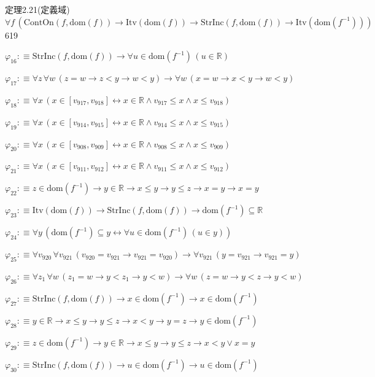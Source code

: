 \begin{fullproof}{定理2.21(定義域)}{$\forall f\,(\mathrm{ContOn}(f,\mathrm{dom}(f)) \to \mathrm{Itv}(\mathrm{dom}(f)) \to \mathrm{StrInc}(f,\mathrm{dom}(f)) \to \mathrm{Itv}(\mathrm{dom}(f^{-1})))$}{619}
\begin{abbrevlist}
\item $\varphi_{16} :\equiv \mathrm{StrInc}(f,\mathrm{dom}(f)) \to \forall u \in \mathrm{dom}(f^{-1})\,(u \in \mathbb{R})$
\item $\varphi_{17} :\equiv \forall z\,\forall w\,(z = w \to z < y \to w < y) \to \forall w\,(x = w \to x < y \to w < y)$
\item $\varphi_{18} :\equiv \forall x\,(x \in [v_{917},v_{918}] \leftrightarrow x \in \mathbb{R} \land v_{917} \leq x \land x \leq v_{918})$
\item $\varphi_{19} :\equiv \forall x\,(x \in [v_{914},v_{915}] \leftrightarrow x \in \mathbb{R} \land v_{914} \leq x \land x \leq v_{915})$
\item $\varphi_{20} :\equiv \forall x\,(x \in [v_{908},v_{909}] \leftrightarrow x \in \mathbb{R} \land v_{908} \leq x \land x \leq v_{909})$
\item $\varphi_{21} :\equiv \forall x\,(x \in [v_{911},v_{912}] \leftrightarrow x \in \mathbb{R} \land v_{911} \leq x \land x \leq v_{912})$
\item $\varphi_{22} :\equiv z \in \mathrm{dom}(f^{-1}) \to y \in \mathbb{R} \to x \leq y \to y \leq z \to x = y \to x = y$
\item $\varphi_{23} :\equiv \mathrm{Itv}(\mathrm{dom}(f)) \to \mathrm{StrInc}(f,\mathrm{dom}(f)) \to \mathrm{dom}(f^{-1}) \subseteq \mathbb{R}$
\item $\varphi_{24} :\equiv \forall y\,(\mathrm{dom}(f^{-1}) \subseteq y \leftrightarrow \forall u \in \mathrm{dom}(f^{-1})\,(u \in y))$
\item $\varphi_{25} :\equiv \forall v_{920}\,\forall v_{921}\,(v_{920} = v_{921} \to v_{921} = v_{920}) \to \forall v_{921}\,(y = v_{921} \to v_{921} = y)$
\item $\varphi_{26} :\equiv \forall z_{1}\,\forall w\,(z_{1} = w \to y < z_{1} \to y < w) \to \forall w\,(z = w \to y < z \to y < w)$
\item $\varphi_{27} :\equiv \mathrm{StrInc}(f,\mathrm{dom}(f)) \to x \in \mathrm{dom}(f^{-1}) \to x \in \mathrm{dom}(f^{-1})$
\item $\varphi_{28} :\equiv y \in \mathbb{R} \to x \leq y \to y \leq z \to x < y \to y = z \to y \in \mathrm{dom}(f^{-1})$
\item $\varphi_{29} :\equiv z \in \mathrm{dom}(f^{-1}) \to y \in \mathbb{R} \to x \leq y \to y \leq z \to x < y \lor x = y$
\item $\varphi_{30} :\equiv \mathrm{StrInc}(f,\mathrm{dom}(f)) \to u \in \mathrm{dom}(f^{-1}) \to u \in \mathrm{dom}(f^{-1})$

\end{abbrevlist}
\end{fullproof}
